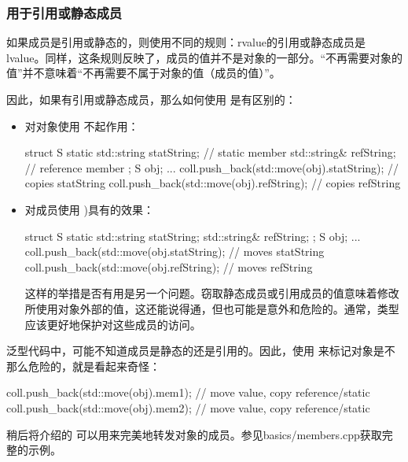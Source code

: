 \subsubsection{ 用于引用或静态成员}

如果成员是引用或静态的，则使用不同的规则：rvalue的引用或静态成员是lvalue。同样，这条规则反映了，成员的值并不是对象的一部分。“不再需要对象的值”并不意味着“不再需要不属于对象的值（成员的值）”。

因此，如果有引用或静态成员，那么如何使用  是有区别的：

\begin{itemize}
	\item 对对象使用  不起作用：

	\begin{cppcode}
struct S {
	static std::string statString; // static member
	std::string& refString; // reference member
};
S obj;
...
coll.push_back(std::move(obj).statString); // copies statString
coll.push_back(std::move(obj).refString); // copies refString
	\end{cppcode}
	\item 对成员使用 )具有的效果：

	\begin{cppcode}
struct S {
	static std::string statString;
	std::string& refString;
};
S obj;
...
coll.push_back(std::move(obj.statString); // moves statString
coll.push_back(std::move(obj.refString); // moves refString
	\end{cppcode}
	这样的举措是否有用是另一个问题。窃取静态成员或引用成员的值意味着修改所使用对象外部的值，这还能说得通，但也可能是意外和危险的。通常，类型应该更好地保护对这些成员的访问。

\end{itemize}

泛型代码中，可能不知道成员是静态的还是引用的。因此，使用  来标记对象是不那么危险的，就是看起来奇怪：

\begin{cppcode}
coll.push_back(std::move(obj).mem1); // move value, copy reference/static
coll.push_back(std::move(obj).mem2); // move value, copy reference/static
\end{cppcode}

稍后将介绍的  可以用来完美地转发对象的成员。参见basics/members.cpp获取完整的示例。
























